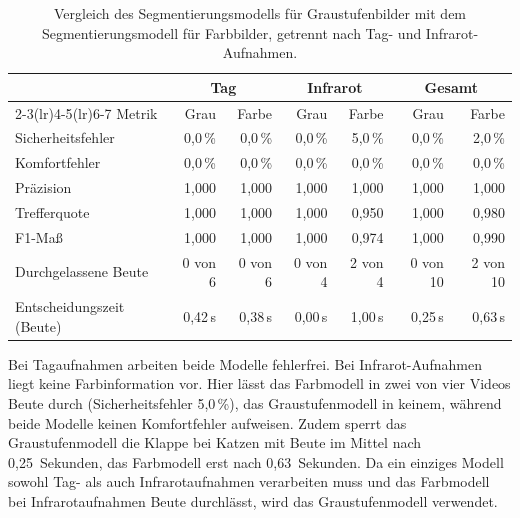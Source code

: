 \begin{table}[H]
    \centering
    \small
    \begin{tabular}{lrrrrrr}
        \toprule
        & \multicolumn{2}{c}{Tag} & \multicolumn{2}{c}{Infrarot} & \multicolumn{2}{c}{Gesamt} \\
        \cmidrule(lr){2-3}\cmidrule(lr){4-5}\cmidrule(lr){6-7}
        Metrik & Grau & Farbe & Grau & Farbe & Grau & Farbe \\
        \midrule
        Sicherheitsfehler & 0,0\,\% & 0,0\,\% & 0,0\,\% & 5,0\,\% & 0,0\,\% & 2,0\,\% \\
        Komfortfehler & 0,0\,\% & 0,0\,\% & 0,0\,\% & 0,0\,\% & 0,0\,\% & 0,0\,\% \\
        Präzision & 1,000 & 1,000 & 1,000 & 1,000 & 1,000 & 1,000 \\
        Trefferquote & 1,000 & 1,000 & 1,000 & 0,950 & 1,000 & 0,980 \\
        F1-Maß & 1,000 & 1,000 & 1,000 & 0,974 & 1,000 & 0,990 \\
        Durchgelassene Beute & 0 von 6 & 0 von 6 & 0 von 4 & 2 von 4 & 0 von 10 & 2 von 10 \\
        Entscheidungszeit (Beute) & 0,42\,s & 0,38\,s & 0,00\,s & 1,00\,s & 0,25\,s & 0,63\,s \\
        \bottomrule
    \end{tabular}
    \caption{Vergleich des Segmentierungsmodells für Graustufenbilder mit dem Segmentierungsmodell für Farbbilder, getrennt nach Tag- und Infrarot-Aufnahmen.}
    \label{tab:ablation_gray}
\end{table}

Bei Tagaufnahmen arbeiten beide Modelle fehlerfrei. Bei Infrarot-Aufnahmen liegt keine Farbinformation vor. Hier lässt das Farbmodell in zwei von vier Videos Beute durch (Sicherheitsfehler 5,0\,\%), das Graustufenmodell in keinem, während beide Modelle keinen Komfortfehler aufweisen. Zudem sperrt das Graustufenmodell die Klappe bei Katzen mit Beute im Mittel nach 0,25~Sekunden, das Farbmodell erst nach 0,63~Sekunden. Da ein einziges Modell sowohl Tag- als auch Infrarotaufnahmen verarbeiten muss und das Farbmodell bei Infrarotaufnahmen Beute durchlässt, wird das Graustufenmodell verwendet.
